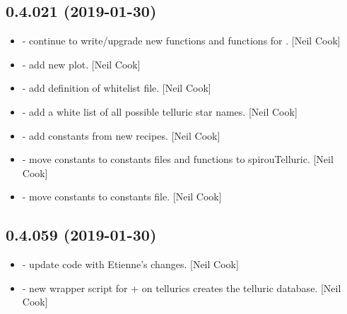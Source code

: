 \documentclass[a4paper,10pt,english]{report}
\begin{document}
\subsection{0.4.021 (2019-01-30)}
\label{\detokenize{misc/changelog:id201}}\begin{itemize}
\item {} 
 - continue to write/upgrade new  functions
and functions for . {[}Neil Cook{]}

\item {} 
 - add new  plot. {[}Neil Cook{]}

\item {} 
 - add definition of whitelist file. {[}Neil Cook{]}

\item {} 
 - add a white list of all possible telluric star
names. {[}Neil Cook{]}

\item {} 
 - add constants from new recipes. {[}Neil Cook{]}

\item {} 
 - move constants to constants files and functions
to spirouTelluric. {[}Neil Cook{]}

\item {} 
 - move constants to constants file. {[}Neil Cook{]}

\end{itemize}


\subsection{0.4.059 (2019-01-30)}
\label{\detokenize{misc/changelog:id202}}\begin{itemize}
\item {} 
 - update code with Etienne’s changes. {[}Neil Cook{]}

\item {} 
 - new wrapper script for  +  on
tellurics \textendash{} creates the telluric database. {[}Neil Cook{]}

\end{itemize}
\end{document}
